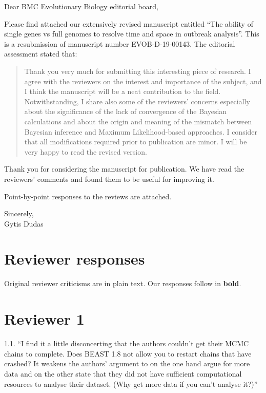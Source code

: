 \documentclass[11pt,oneside,letterpaper]{article}
\begin{document}

Dear BMC Evolutionary Biology editorial board,

Please find attached our extensively revised manuscript entitled ``The ability of single genes vs full genomes to resolve time and space in outbreak analysis''.  This is a resubmission of manuscript number EVOB-D-19-00143. The editorial assessment stated that:

\begin{quote}
Thank you very much for submitting this interesting piece of research.
I agree with the reviewers on the interest and importance of the subject, and I think the manuscript will be a neat contribution to the field.
Notwithstanding, I share also some of the reviewers' concerns especially about the significance of the lack of convergence of the Bayesian calculations and about the origin and meaning of the mismatch between Bayesian inference and Maximum Likelihood-based approaches.
I consider that all modifications required prior to publication are minor.
I will be very happy to read the revised version.
\end{quote}

Thank you for considering the manuscript for publication. We have read the reviewers' comments and found them to be useful for improving it.

Point-by-point responses to the reviews are attached.

Sincerely,\\
Gytis Dudas

\restoregeometry

\newpage

\section*{Reviewer responses}

Original reviewer criticisms are in plain text.  Our responses follow in \textbf{bold}.

\section*{Reviewer 1}
1.1. ``I find it a little disconcerting that the authors couldn't get their MCMC chains to complete. Does BEAST 1.8 not allow you to restart chains that have crashed? It weakens the authors' argument to on the one hand argue for more data and on the other state that they did not have sufficient computational resources to analyse their dataset. (Why get more data if you can't analyse it?)''
\end{document}
